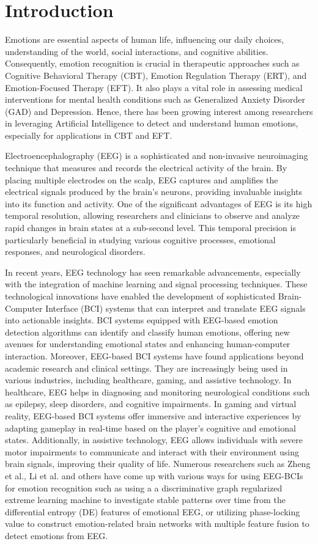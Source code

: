 
\section{Introduction}
Emotions are essential aspects of human life, influencing our daily choices, understanding of the world, social interactions, and cognitive abilities. Consequently, emotion recognition is crucial in therapeutic approaches such as Cognitive Behavioral Therapy (CBT), Emotion Regulation Therapy (ERT), and Emotion-Focused Therapy (EFT). It also plays a vital role in assessing medical interventions for mental health conditions such as Generalized Anxiety Disorder (GAD) and Depression. Hence, there has been growing interest among researchers in leveraging Artificial Intelligence to detect and understand human emotions, especially for applications in CBT and EFT.

Electroencephalography (EEG) is a sophisticated and non-invasive neuroimaging technique that measures and records the electrical activity of the brain. By placing multiple electrodes on the scalp, EEG captures and amplifies the electrical signals produced by the brain's neurons, providing invaluable insights into its function and activity. One of the significant advantages of EEG is its high temporal resolution, allowing researchers and clinicians to observe and analyze rapid changes in brain states at a sub-second level. This temporal precision is particularly beneficial in studying various cognitive processes, emotional responses, and neurological disorders.

In recent years, EEG technology has seen remarkable advancements, especially with the integration of machine learning and signal processing techniques. These technological innovations have enabled the development of sophisticated Brain-Computer Interface (BCI) systems that can interpret and translate EEG signals into actionable insights. BCI systems equipped with EEG-based emotion detection algorithms can identify and classify human emotions, offering new avenues for understanding emotional states and enhancing human-computer interaction. Moreover, EEG-based BCI systems have found applications beyond academic research and clinical settings. They are increasingly being used in various industries, including healthcare, gaming, and assistive technology. In healthcare, EEG helps in diagnosing and monitoring neurological conditions such as epilepsy, sleep disorders, and cognitive impairments. In gaming and virtual reality, EEG-based BCI systems offer immersive and interactive experiences by adapting gameplay in real-time based on the player's cognitive and emotional states. Additionally, in assistive technology, EEG allows individuals with severe motor impairments to communicate and interact with their environment using brain signals, improving their quality of life. Numerous researchers such as Zheng et al., Li et al. and others have come up with various ways for using EEG-BCIs for emotion recognition such as using a a discriminative graph regularized extreme learning machine to investigate stable patterns over time from the differential entropy (DE) features of emotional EEG, or utilizing phase-locking value to construct emotion-related brain networks with multiple feature fusion to detect emotions from EEG.

